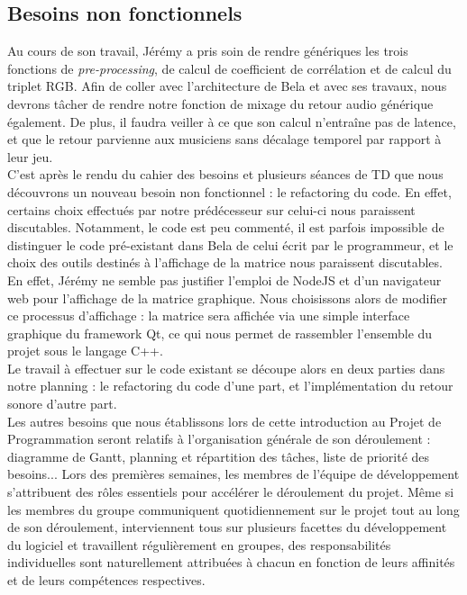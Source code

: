 \subsection{Besoins non fonctionnels}
Au cours de son travail, Jérémy a pris soin de rendre génériques les
trois fonctions de \textit{pre-processing}, de calcul de coefficient
de corrélation et de calcul du triplet RGB. Afin de coller avec
l'architecture de Bela et avec ses travaux, nous devrons tâcher de
rendre notre fonction de mixage du retour audio générique
également. De plus, il faudra veiller à ce que son calcul n'entraîne
pas de latence, et que le retour parvienne aux musiciens sans décalage
temporel par rapport à leur jeu. \\ C'est après le rendu du cahier des
besoins et plusieurs séances de TD que nous découvrons un nouveau
besoin non fonctionnel : le refactoring du code. En effet, certains
choix effectués par notre prédécesseur sur celui-ci nous paraissent
discutables. Notamment, le code est peu commenté, il est parfois
impossible de distinguer le code pré-existant dans Bela de celui écrit
par le programmeur, et le choix des outils destinés à l'affichage de
la matrice nous paraissent discutables. En effet, Jérémy ne semble pas
justifier l'emploi de NodeJS et d'un navigateur web pour l'affichage
de la matrice graphique. Nous choisissons alors de modifier ce
processus d'affichage : la matrice sera affichée via une simple
interface graphique du framework Qt, ce qui nous permet de rassembler
l'ensemble du projet sous le langage C++. \\ Le travail à effectuer
sur le code existant se découpe alors en deux parties dans notre
planning : le refactoring du code d'une part, et l'implémentation du
retour sonore d'autre part. \\
Les autres besoins que nous établissons lors de cette introduction au
Projet de Programmation seront relatifs à l'organisation générale de
son déroulement : diagramme de Gantt, planning et répartition des
tâches, liste de priorité des besoins... Lors des premières semaines,
les membres de l'équipe de développement s'attribuent des rôles
essentiels pour accélérer le déroulement du projet. Même si les
membres du groupe communiquent quotidiennement sur le projet tout au
long de son déroulement, interviennent tous sur plusieurs facettes du
développement du logiciel et travaillent régulièrement en groupes, des
responsabilités individuelles sont naturellement attribuées à chacun
en fonction de leurs affinités et de leurs compétences respectives.

